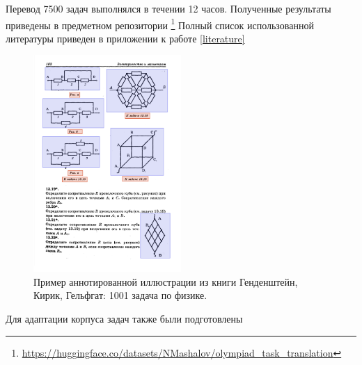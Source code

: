 Перевод 7500 задач выполнялся в течении 12 часов. Полученные результаты приведены в предметном репозитории \footnote{\url{https://huggingface.co/datasets/NMashalov/olympiad_task_translation}}
Полный список использованной литературы приведен в приложении к работе \ref{literature}

\begin{figure}[h]
    \centering
    \includegraphics[width=0.5\textwidth]{assets/work/dataset/kirik_labeling.png}
    \caption{Пример аннотированной иллюстрации из книги Генденштейн, Кирик, Гельфгат: 1001 задача по физике.}
    \label{annotation}
\end{figure}

Для адаптации корпуса задач также были подготовлены